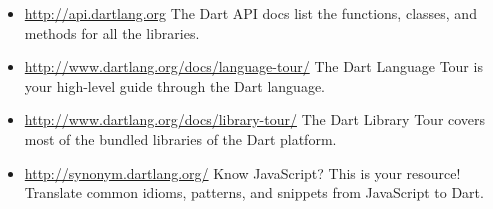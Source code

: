 \begin{itemize}
\item \url{http://api.dartlang.org} The Dart API docs list the functions, classes, and methods for all the libraries.
\item \url{http://www.dartlang.org/docs/language-tour/} The Dart Language Tour is your high-level guide through the Dart language.
\item \url{http://www.dartlang.org/docs/library-tour/} The Dart Library Tour covers most of the bundled libraries of the Dart platform.
\item \url{http://synonym.dartlang.org/} Know JavaScript? This is your resource! Translate common idioms, patterns, and snippets from JavaScript to Dart.
\end{itemize}
